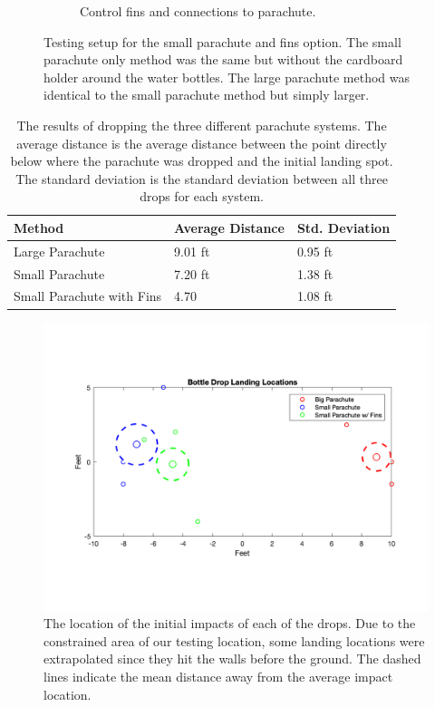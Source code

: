 \documentclass[]{auvsi_doc}
\begin{document}
\begin{figure}[h!]
\begin{subfigure}{0.49\linewidth}
     \caption{Control fins and connections to parachute.}\label{fig:ControlFins}
   \end{subfigure}
\caption{Testing setup for the small parachute and fins option. The small parachute only method was the same but without the cardboard holder around the water bottles. The large parachute method was identical to the small parachute method but simply larger.} 
\label{fig:combined}
\end{figure}

\begin{table}[h]
\caption{The results of dropping the three different parachute systems. The average distance is the average distance between the point directly below where the parachute was dropped and the initial landing spot. The standard deviation is the standard deviation between all three drops for each system.}
\label{table:results}

\begin{tabular}{| l | l | l |}
\hline
Method & Average Distance & Std. Deviation\\
\hline
Large Parachute & 9.01 ft  & 0.95 ft\\
Small Parachute & 7.20 ft  & 1.38 ft\\
Small Parachute with Fins & 4.70  & 1.08 ft\\
\hline

\end{tabular}

\end{table}

\begin{figure}[h]
\includegraphics[width=\columnwidth]{LandingLocations.png}
\caption{The location of the initial impacts of each of the drops. Due to the constrained area of our testing location, some landing locations were extrapolated since they hit the walls before the ground. The dashed lines indicate the mean distance away from the average impact location.}
\label{fig:locations}
\end{figure}
\end{document}
